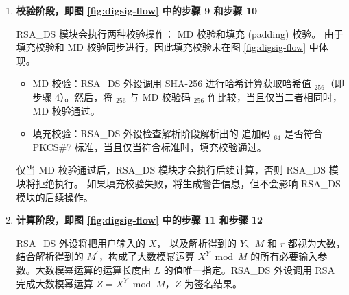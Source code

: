 \documentclass[main\_\_CN.tex]{subfiles}
\begin{document}
\begin{enumerate}
    \item {\bfseries 校验阶段，即图 \ref{fig:digsig-flow} 中的步骤 9 和步骤 10}

        RSA\_DS 模块会执行两种校验操作： MD 校验和填充 (padding) 校验。
        由于填充校验和 MD 校验同步进行，因此填充校验未在图 \ref{fig:digsig-flow} 中体现。


        \begin{itemize}

            \item MD 校验：RSA\_DS 外设调用 SHA-256 进行哈希计算获取哈希值 \begin{math}[CALC\_MD]_{256}\end{math}（即步骤 4）。然后，将 \begin{math}[CALC\_MD]_{256}\end{math} 与 MD 校验码 \begin{math}[MD]_{256}\end{math} 作比较，当且仅当二者相同时，MD 校验通过。

            \item 填充校验：RSA\_DS 外设检查解析阶段解析出的 追加码 \begin{math}[\beta]_{64} \end{math} 是否符合 PKCS\#7 标准，当且仅当符合标准时，填充校验通过。

        \end{itemize}

        仅当 MD 校验通过后，RSA\_DS 模块才会执行后续计算，否则 RSA\_DS 模块将拒绝执行。
        如果填充校验失败，将生成警告信息，但不会影响 RSA\_DS 模块的后续操作。

    \item {\bfseries 计算阶段，即图 \ref{fig:digsig-flow} 中的步骤 11 和步骤 12}

        RSA\_DS 外设将把用户输入的 \begin{math}X\end{math}，
        以及解析得到的 \begin{math}Y\end{math}、\begin{math}M\end{math} 和 \begin{math}\overline{r}\end{math} 都视为大数，结合解析得到的 \begin{math}M^{\prime}\end{math}，构成了大数模幂运算 \begin{math} X^{Y} \bmod M\end{math} 的所有必要输入参数。大数模幂运算的运算长度由 \begin{math}L\end{math} 的值唯一指定。RSA\_DS 外设调用 RSA 完成大数模幂运算 \begin{math}Z = X^{Y} \bmod M\end{math}，\begin{math}Z\end{math} 为签名结果。

\end{enumerate}
\end{document}
